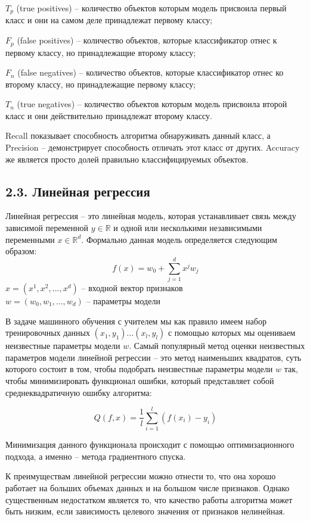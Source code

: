 $T_p$ (true positives) -- количество объектов которым модель присвоила первый класс и они на самом деле принадлежат первому классу; 

$F_p$ (false positives) -- количество объектов, которые классификатор отнес к первому классу, но  принадлежащие второму классу;

$F_n$ (false negatives) -- количество объектов, которые классификатор отнес ко второму классу, но принадлежащие первому классу;

$T_n$ (true negatives) -- количество объектов которым модель присвоила второй класс и они действительно принадлежат второму классу.

 
 Recall показывает способность алгоритма обнаруживать данный класс, а Precision --  демонстрирует способность отличать этот класс от других. Accuracy же является просто долей правильно классифицируемых объектов.
 

\subsection{2.3. Линейная регрессия}

Линейная регрессия \cite{linear regression} -- это линейная модель, которая устанавливает связь между зависимой переменной $y \in \mathbb{R}$ и одной или несколькими независимыми переменными $x \in \mathbb{R}^d$. Формально данная модель определяется следующим образом:
$$f(x)=w_0 + \sum_{j=1}^{d}x^j w_j$$
$x = (x^1, x^2, ..., x^d)$ -- входной вектор признаков \\
$w = (w_0, w_1, ... ,w_d)$ -- параметры модели

В задаче машинного обучения с учителем мы как правило имеем набор тренировочных данных $(x_1, y_1) ... (x_l,  y_l)$ с помощью которых мы оцениваем неизвестные параметры модели $w$. Самый популярный метод оценки неизвестных параметров модели линейной регрессии -- это метод наименьших квадратов, суть которого состоит в том, чтобы подобрать неизвестные параметры модели $w$ так, чтобы минимизировать функционал ошибки, который представляет собой среднеквадратичную ошибку алгоритма:

\begin{equation}\label{linreg functional}
Q(f, x) = \frac{1}{l}\sum_{i=1}^{l} (f(x_i) - y_i)
\end{equation}

Минимизация данного функционала происходит с помощью оптимизационного подхода, а именно -- метода градиентного спуска.

К преимуществам линейной регрессии можно отнести то, что она хорошо работает на больших объемах данных и на большом числе признаков. Однако существенным недостатком  является то, что качество работы алгоритма может быть низким, если зависимость целевого значения от признаков нелинейная. 

